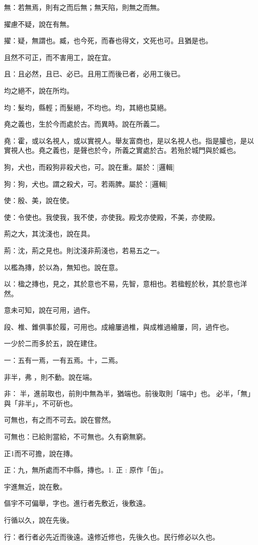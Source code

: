 \begin{pinyinscope}
無：若無焉，則有之而后無；無天陷，則無之而無。

擢慮不疑，說在有無。

擢：疑，無謂也。臧，也今死，而春也得文，文死也可。且猶是也。

且然不可正，而不害用工，說在宜。

且：且必然，且已、必已。且用工而後已者，必用工後已。

均之絕不，說在所均。

均：髮均，縣輕；而髮絕，不均也。均，其絕也莫絕。

堯之義也，生於今而處於古。而異時。說在所義二。

堯：霍，或以名視人，或以實視人。舉友富商也，是以名視人也。指是臛也，是以實視人也。堯之義也，是聲也於今，所義之實處於古。若殆於城門與於臧也。

狗，犬也，而殺狗非殺犬也，可。說在重。屬於：[邏輯]

狗：狗，犬也。謂之殺犬，可。若兩脾。屬於：[邏輯]

使：殷、美，說在使。

使：令使也。我使我，我不使，亦使我。殿戈亦使殿，不美，亦使殿。

荊之大，其沈淺也，說在具。

荊：沈，荊之見也。則沈淺非荊淺也，若易五之一。

以檻為摶，於以為，無知也。說在意。

以：楹之摶也，見之，其於意也不易，先智，意相也。若楹輕於秋，其於意也洋然。

意未可知，說在可用，過仵。

段、椎、錐俱事於履，可用也。成繪屢過椎，與成椎過繪屢，同，過仵也。

一少於二而多於五，說在建住。

一：五有一焉，一有五焉。十，二焉。

非半，弗𣃈，則不動。說在端。

非：𣃈半，進前取也，前則中無為半，猶端也。前後取則「端中」也。𣃈必半，「無」與「非半」，不可斫也。

可無也，有之而不可去。說在嘗然。

可無也：已給則當給，不可無也。久有窮無窮。

正1而不可擔，說在摶。

正：九，無所處而不中縣，摶也。1. 正 : 原作「缶」。

宇進無近，說在敷。

傴宇不可偏舉，字也。進行者先敷近，後敷遠。

行循以久，說在先後。

行：者行者必先近而後遠。遠修近修也，先後久也。民行修必以久也。


\end{pinyinscope}
